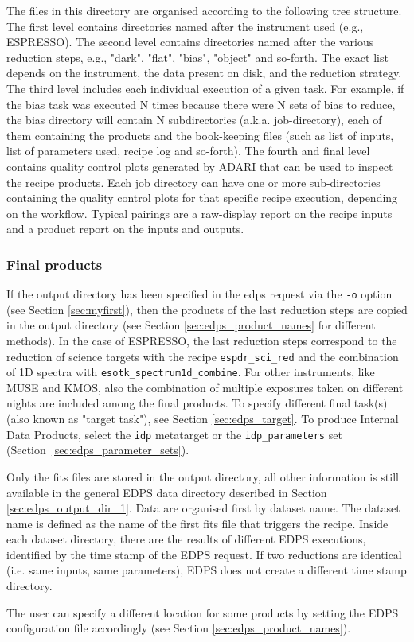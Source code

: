 The files in this directory are organised according to the following tree structure.
The first level contains directories named after the instrument used (e.g., ESPRESSO). The second level contains directories named after the various reduction steps, e.g., "dark", "flat", "bias", "object" and so-forth. The exact list depends on the instrument, the data present on disk, and the reduction strategy.
The third level includes each individual execution of a given task. For example, if the bias task was executed N times because there were N sets of bias to reduce, the bias directory will contain N subdirectories (a.k.a. job-directory), each of them containing the products and the book-keeping files (such as list of inputs, list of parameters used, recipe log and so-forth).
The fourth and final level contains quality control plots generated by ADARI that can be used to inspect the recipe products. Each job directory can have one or more sub-directories containing the quality control plots for that specific recipe execution, depending on the workflow. Typical pairings are a raw-display report on the recipe inputs and a product report on the inputs and outputs.

\subsubsection{Final products}
\label{sec:edps_output_dir_2}

If the output directory has been specified in the edps request via the {\tt -o} option (see Section \ref{sec:myfirst}), then the products of the last reduction steps are copied in the output directory (see Section \ref{sec:edps_product_names} for different methods).  In the case of ESPRESSO, the last reduction steps correspond to the reduction of science targets with the recipe {\tt espdr\_sci\_red} and the combination of 1D spectra with {\tt esotk\_spectrum1d\_combine}. For other instruments, like MUSE and KMOS, also the combination of multiple exposures taken on different nights are included among the final products. To specify different final task(s) (also known as "target task"), see Section \ref{sec:edps_target}. To produce Internal Data Products, select the {\tt idp} metatarget or the {\tt idp\_parameters} set (Section~\ref{sec:edps_parameter_sets}). 

 
Only the fits files are stored in the output directory, all other information is still available in the general EDPS data directory described in Section \ref{sec:edps_output_dir_1}.
Data are organised first by dataset name. The dataset name is defined as the name of the first fits file that triggers the recipe. Inside each dataset directory, there are the results of different EDPS executions, identified by the time stamp of the EDPS request. If two reductions are identical (i.e. same inputs, same parameters), EDPS does not create a different time stamp directory.


The user can specify a different location for some products by setting the EDPS configuration file accordingly (see Section \ref{sec:edps_product_names}).

